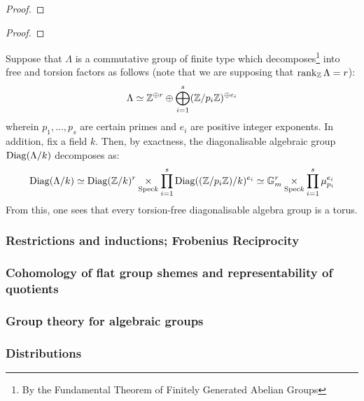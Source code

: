             \begin{proposition}
                
            \end{proposition}
                \begin{proof}
                    
                \end{proof}
            \begin{proposition}
                
            \end{proposition}
                \begin{proof}
                    
                \end{proof}
            \begin{corollary} \label{coro: the_fundamental_theorem_of_diagonalisable_algebraic_groups}
                Suppose that $\Lambda$ is a commutative group of finite type which decomposes\footnote{By the Fundamental Theorem of Finitely Generated Abelian Groups} into free and torsion factors as follows (note that we are supposing that $\operatorname{rank}_{\mathbb{Z}} \Lambda = r$):
                    $$\Lambda \simeq \mathbb{Z}^{\oplus r} \oplus \bigoplus_{i = 1}^s (\mathbb{Z}/p_i\mathbb{Z})^{\oplus e_i}$$
                wherein $p_1, ..., p_s$ are certain primes and $e_i$ are positive integer exponents. In addition, fix a field $k$. Then, by exactness, the diagonalisable algebraic group $\mathrm{Diag}(\Lambda/k)$ decomposes as:
                    $$\Diag(\Lambda/k) \cong \Diag(\Z/k)^r \x_{\Spec k} \prod_{i = 1}^s \Diag((\Z/p_i\Z)/k)^{e_i} \cong \G_m^r \x_{\Spec k} \prod_{i = 1}^s \mu_{p_i}^{e_i}$$
                From this, one sees that every torsion-free diagonalisable algebra group is a torus.
            \end{corollary}
    
        \subsubsection{Restrictions and inductions; Frobenius Reciprocity}
        
        \subsubsection{Cohomology of flat group shemes and representability of quotients}
        
        \subsubsection{Group theory for algebraic groups}
        
        \subsubsection{Distributions}